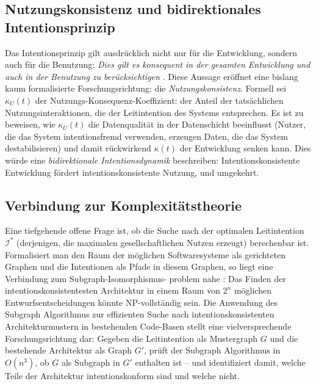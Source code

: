 ﻿\documentclass[a4paper,12pt]{article}
\theoremstyle{definition}
\begin{document}
\subsection{Nutzungskonsistenz und bidirektionales Intentionsprinzip}

Das Intentionsprinzip gilt ausdrücklich nicht nur für die Entwicklung,
sondern auch für die Benutzung: \textit{\glqq{}Dies gilt es konsequent in
der gesamten Entwicklung und auch in der Benutzung zu berücksichtigen\grqq{}}
\cite{epp2026paradigma}. Diese Aussage eröffnet eine bislang kaum
formalisierte Forschungsrichtung: die \emph{Nutzungskonsistenz}. Formell
sei $\kappa_U(t)$ der Nutzungs-Konsequenz-Koeffizient: der Anteil der
tatsächlichen Nutzungsinteraktionen, die der Leitintention des Systems
entsprechen. Es ist zu beweisen, wie $\kappa_U(t)$ die Datenqualität
in der Datenschicht beeinflusst (Nutzer, die das System intentionsfremd
verwenden, erzeugen Daten, die das System destabilisieren) und damit
rückwirkend $\kappa(t)$ der Entwicklung senken kann. Dies würde eine
\emph{bidirektionale Intentionsdynamik} beschreiben: Intentionskonsistente
Entwicklung fördert intentionskonsistente Nutzung, und umgekehrt.

\subsection{Verbindung zur Komplexitätstheorie}

Eine tiefgehende offene Frage ist, ob die Suche nach der optimalen
Leitintention $\mathcal{I}^*$ (derjenigen, die maximalen gesellschaftlichen
Nutzen erzeugt) berechenbar ist. Formalisiert man den Raum der möglichen
Softwaresysteme als gerichteten Graphen und die Intentionen als Pfade
in diesem Graphen, so liegt eine Verbindung zum Subgraph-Isomorphismus-
problem nahe \cite{cook1971complexity, epp2026subgraph}: Das Finden
der intentionskonsistentesten Architektur in einem Raum von $2^n$
möglichen Entwurfsentscheidungen könnte NP-vollständig sein.
Die Anwendung des Subgraph Algorithmus \cite{epp2026subgraph} zur
effizienten Suche nach intentionskonsistenten Architekturmustern
in bestehenden Code-Basen stellt eine vielversprechende Forschungsrichtung
dar: Gegeben die Leitintention als Mustergraph $G$ und die bestehende
Architektur als Graph $G'$, prüft der Subgraph Algorithmus in $O(n^3)$,
ob $G$ als Subgraph in $G'$ enthalten ist -- und identifiziert damit,
welche Teile der Architektur intentionskonform sind und welche nicht.
\end{document}
